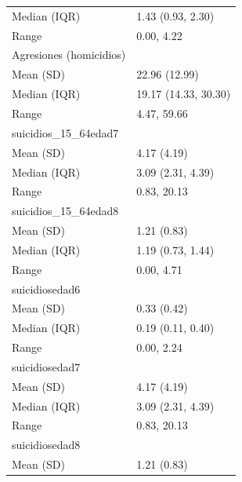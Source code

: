 \begin{table}
\begin{tabular}{ll}
\hspace{1em}Median (IQR) & 1.43 (0.93, 2.30)\\
\hspace{1em}Range & 0.00, 4.22\\
Agresiones (homicidios) & \\
\addlinespace
\hspace{1em}Mean (SD) & 22.96 (12.99)\\
\hspace{1em}Median (IQR) & 19.17 (14.33, 30.30)\\
\hspace{1em}Range & 4.47, 59.66\\
suicidios\_15\_64edad7 & \\
\hspace{1em}Mean (SD) & 4.17 \vphantom{1} (4.19)\\
\addlinespace
\hspace{1em}Median (IQR) & 3.09 (2.31, \vphantom{1} 4.39)\\
\hspace{1em}Range & 0.83, \vphantom{1} 20.13\\
suicidios\_15\_64edad8 & \\
\hspace{1em}Mean (SD) & 1.21 \vphantom{1} (0.83)\\
\hspace{1em}Median (IQR) & 1.19 (0.73, \vphantom{1} 1.44)\\
\addlinespace
\hspace{1em}Range & 0.00, \vphantom{1} 4.71\\
suicidiosedad6 & \\
\hspace{1em}Mean (SD) & 0.33 (0.42)\\
\hspace{1em}Median (IQR) & 0.19 (0.11, 0.40)\\
\hspace{1em}Range & 0.00, 2.24\\
\addlinespace
suicidiosedad7 & \\
\hspace{1em}Mean (SD) & 4.17 (4.19)\\
\hspace{1em}Median (IQR) & 3.09 (2.31, 4.39)\\
\hspace{1em}Range & 0.83, 20.13\\
suicidiosedad8 & \\
\addlinespace
\hspace{1em}Mean (SD) & 1.21 (0.83)\\

\end{tabular}
\end{table}
